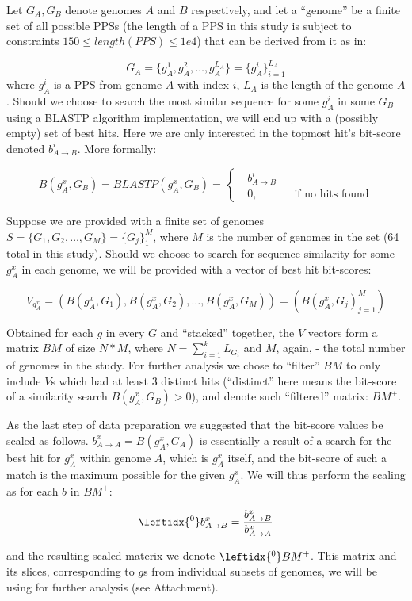 \documentclass{article}
\begin{document}
Let $G_A, G_B$ denote genomes $A$ and $B$ respectively,
and let a ``genome'' be a finite set of all possible PPSs
(the length of a PPS in this study is subject to constraints
$150 \leq length(PPS) \leq 1e4$) that can be derived from it as in:

\begin{equation}
G_A = \{g_A^1, g_A^2, \ldots, g_A^{L_A}\} = \{g_A^i\}_{i=1}^{L_A}
\end{equation}
where $g_A^i$ is a PPS from genome $A$ with index $i$, $L_A$ is the length of
the genome $A$.
Should we choose to search the most similar sequence for some $g_A^i$ in some
$G_B$ using a BLASTP algorithm implementation, we will end up with a (possibly
empty) set of best hits. Here we are only interested in the topmost hit's
bit-score denoted $b_{A \rightarrow B}^i$. More formally:

\begin{equation}
B(g_A^x, G_B) = BLASTP(g_A^x, G_B)=\left \{
\begin{aligned}
&b_{A \rightarrow B}^i\\
&0, && \text{if no hits found}
\end{aligned} \right.
\end{equation} 

Suppose we are provided with a finite set of genomes \\
$S = \{G_1, G_2, \ldots, G_M\} = \{G_j\}_1^M$, where $M$ is the number of
genomes in the set (64 total in this study). Should we choose to search for
sequence similarity for some $g_A^x$ in each genome, we will be provided with a
vector of best hit bit-scores:

\begin{equation}
V_{g_A^x} = (B(g_A^x, G_1), B(g_A^x, G_2), \ldots, B(g_A^x, G_M)) = (B(g_A^x,
G_j)_{j=1}^M)
\end{equation}

Obtained for each $g$ in every $G$ and ``stacked'' together, the $V$ vectors
form a matrix $BM$ of size $N*M$, where $N=\sum_{i=1}^k L_{G_i}$ and $M$,
again, - the total number of genomes in the study. For further analysis we chose
to ``filter'' $BM$ to only include $V$s which had at least 3 distinct hits
(``distinct'' here means the bit-score of a similarity search $B(g_A^x,
G_B)>0$), and denote such ``filtered'' matrix: $BM^+$.

As the last step of data preparation we suggested that the bit-score values be
scaled as follows. $b_{A \rightarrow A}^x = B(g_A^x, G_A)$ is essentially a
result of a search for the best hit for $g_A^x$ within genome $A$, which is
$g_A^x$ itself, and the bit-score of such a match is the maximum possible for
the given $g_A^x$. We will thus perform the scaling as for each $b$ in $BM^+$:

\begin{equation}
\leftidx{^0}b_{A \rightarrow B}^x = \dfrac{b_{A \rightarrow B}^x}{b_{A \rightarrow
A}^x} 
\end{equation}

and the resulting scaled materix we denote $\leftidx{^0}BM^+$. This matrix and
its slices, corresponding to $g$s from individual subsets of genomes, we will
be using for further analysis (see Attachment).
\end{document}
